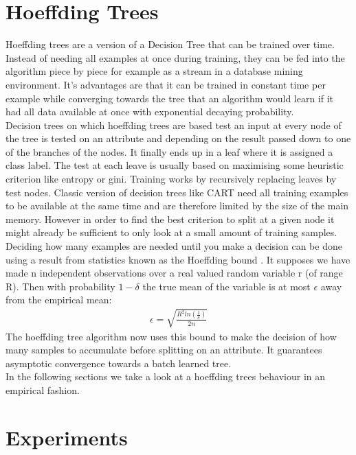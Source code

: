 \documentclass[conference]{IEEEtran}
\begin{document}
\section{Hoeffding Trees}
\label{Trees}
Hoeffding trees \cite{b3} are a version of a Decision Tree that can be trained over time. Instead of needing all examples at once during training, they can be fed into the algorithm piece by piece for example as a stream in a database mining environment.
It's advantages are that it can be trained in constant time per example while converging towards the tree that an algorithm would learn if it had all data available at once with exponential decaying probability.\\
Decision trees on which hoeffding trees are based test an input at every node of the tree is tested on an attribute and depending on the result passed down to one of the branches of the nodes.
It finally ends up in a leaf where it is assigned a class label. 
The test at each leave is usually based on maximising some heuristic criterion like entropy or gini.
Training works by recursively replacing leaves by test nodes. 
Classic version of decision trees like CART \cite{b9} need all training examples to be available at the same time and are therefore limited by the size of the main memory.
However in order to find the best criterion to split at a given node it might already be sufficient to only look at a small amount of training samples. Deciding how many examples are needed until you make a decision can be done using a result from statistics known as the Hoeffding bound \cite{b18}.
It supposes we have made n independent observations over a real valued random variable r (of range R).
Then with probability $ 1 - \delta $ the true mean of the variable is at most $\epsilon$ away from the empirical mean:
\begin{align}
\epsilon = \sqrt{\frac{R^2 ln(\frac{1}{\delta})}{2n}}
\end{align}
The hoeffding tree algorithm now uses this bound to make the decision of how many samples to accumulate before splitting on an attribute.
It guarantees asymptotic convergence towards a batch learned tree. \cite{b3}\\
In the following sections we take a look at a hoeffding trees behaviour in an empirical fashion.

\section{Experiments}
\label{Experiments}
\end{document}
